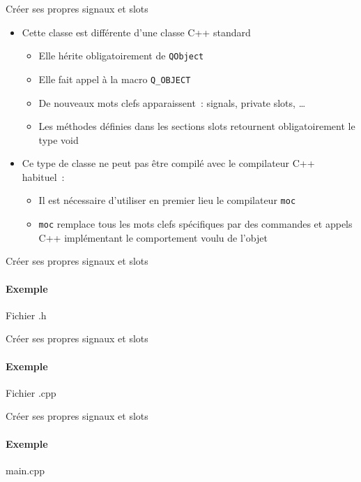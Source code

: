 \documentclass{beamer} %
\begin{document}
\begin{frame}{Créer ses propres signaux et slots}
	
	\begin{itemize}
	\item Cette classe est différente d'une classe C++ standard
		\begin{itemize}
		\item<2-> Elle hérite obligatoirement de \texttt{QObject}
		\item<3-> Elle fait appel à la macro \texttt{Q\_OBJECT}
		\item<4-> De nouveaux mots clefs apparaissent~: {\ttfamily signals, private slots, \ldots}
		\item<5-> Les méthodes définies dans les sections slots retournent \alert{obligatoirement} le type void
		\end{itemize}
	\item<6-> Ce type de classe ne peut pas être compilé avec le compilateur C++ habituel~:
		\begin{itemize}
		\item<7-> Il est nécessaire d'utiliser en premier lieu le compilateur \texttt{moc}
		\item<8-> \texttt{moc} remplace tous les mots clefs spécifiques par des commandes et appels C++ implémentant le comportement voulu de l'objet
		\end{itemize}
	\end{itemize}
\end{frame}
	
\begin{frame}{Créer ses propres signaux et slots}
	\framesubtitle{Exemple}
	\begin{exampleblock}{Fichier .h}
		
	\end{exampleblock}
\end{frame}

\begin{frame}{Créer ses propres signaux et slots}
	\framesubtitle{Exemple}
	\begin{exampleblock}{Fichier .cpp}
		
	\end{exampleblock}
\end{frame}
	
\begin{frame}{Créer ses propres signaux et slots}
	\framesubtitle{Exemple}
	\begin{exampleblock}{main.cpp}
		
	\end{exampleblock}
\end{frame}
	
\end{document}
